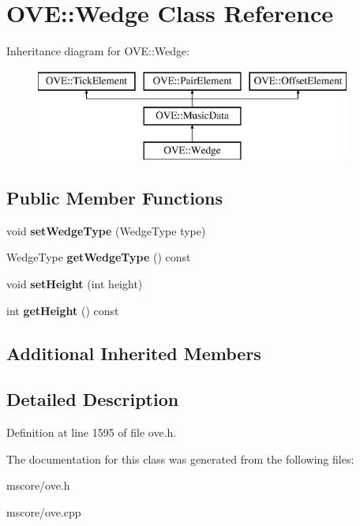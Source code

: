 \hypertarget{class_o_v_e_1_1_wedge}{}\section{O\+VE\+:\+:Wedge Class Reference}
\label{class_o_v_e_1_1_wedge}
Inheritance diagram for O\+VE\+:\+:Wedge\+:\begin{figure}[H]
\begin{center}
\leavevmode
\includegraphics[height=3.000000cm]{class_o_v_e_1_1_wedge}
\end{center}
\end{figure}
\subsection*{Public Member Functions}
\begin{DoxyCompactItemize}
\item 
\mbox{\label{class_o_v_e_1_1_wedge_a8799e672782af23cbe08c5ef59699c1c}} 
void {\bfseries set\+Wedge\+Type} (Wedge\+Type type)
\item 
\mbox{\label{class_o_v_e_1_1_wedge_aecfd520a8ae104075636708d2772cc38}} 
Wedge\+Type {\bfseries get\+Wedge\+Type} () const
\item 
\mbox{\label{class_o_v_e_1_1_wedge_a6133a2000e5e18ce2e848bd34e630020}} 
void {\bfseries set\+Height} (int height)
\item 
\mbox{\label{class_o_v_e_1_1_wedge_aea4a9dcbe52e4336416b2d79b286389a}} 
int {\bfseries get\+Height} () const
\end{DoxyCompactItemize}
\subsection*{Additional Inherited Members}


\subsection{Detailed Description}


Definition at line 1595 of file ove.\+h.



The documentation for this class was generated from the following files\+:\begin{DoxyCompactItemize}
\item 
mscore/ove.\+h\item 
mscore/ove.\+cpp\end{DoxyCompactItemize}
